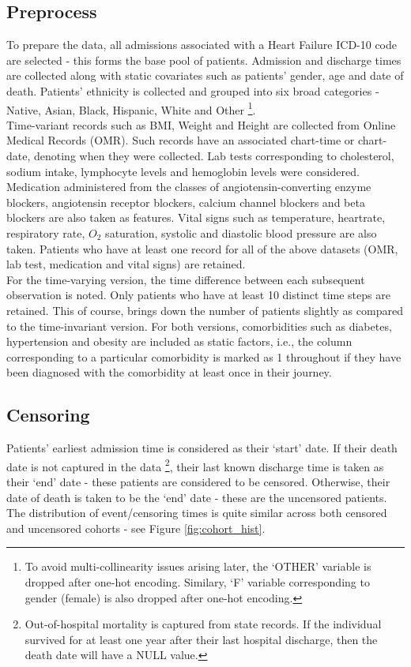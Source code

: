 \documentclass[%
 twocolumn,
 reprint,
 amsmath,amssymb,
 aps,nofootinbib
]{revtex4-2}
\begin{document}
\subsection{\label{preprocess}Preprocess}
To prepare the data, all admissions associated with a Heart Failure ICD-10 code \cite{ICDs} are selected - this forms the base pool of patients. Admission and discharge times are collected along with static covariates such as patients' gender, age and date of death. Patients' ethnicity is collected and grouped into six broad categories - Native, Asian, Black, Hispanic, White and Other \footnote{To avoid multi-collinearity issues arising later, the `OTHER' variable is dropped after one-hot encoding. Similary, `F' variable corresponding to gender (female) is also dropped after one-hot encoding.}.\\

Time-variant records such as BMI, Weight and Height are collected from Online Medical Records (OMR). Such records have an associated chart-time or chart-date, denoting when they were collected. Lab tests corresponding to cholesterol, sodium intake, lymphocyte levels \cite{lymph_count} and hemoglobin levels \cite{hemo} were considered. Medication administered from the classes of angiotensin-converting enzyme blockers, angiotensin receptor blockers, calcium channel blockers and beta blockers are also taken as features. Vital signs such as temperature, heartrate, respiratory rate, $O_2$ saturation, systolic and diastolic blood pressure are also taken. Patients who have at least one record for all of the above datasets (OMR, lab test, medication and vital signs) are retained. \\

For the time-varying version, the time difference between each subsequent observation is noted. Only patients who have at least 10 distinct time steps are retained. This of course, brings down the number of patients slightly as compared to the time-invariant version. For both versions, comorbidities such as diabetes, hypertension and obesity are included as static factors, i.e., the column corresponding to a particular comorbidity is marked as 1 throughout if they have been diagnosed with the comorbidity at least once in their journey.


\subsection{\label{censoring}Censoring}
Patients' earliest admission time is considered as their `start' date. If their death date is not captured in the data \footnote{Out-of-hospital mortality is captured from state records. If the individual survived for at least one year after their last hospital discharge, then the death date will have a NULL value.}, their last known discharge time is taken as their `end' date - these patients are considered to be censored. Otherwise, their date of death is taken to be the `end' date - these are the uncensored patients. The distribution of event/censoring times is quite similar across both censored and uncensored cohorts - see Figure \ref{fig:cohort_hist}.
\end{document}
